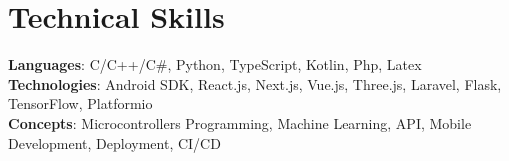 \section{Technical Skills}
    \begin{itemize}[leftmargin=0.15in, label={}]
	\small{\item{
		\textbf{Languages}{: C/C++/C\#, Python, TypeScript, Kotlin, Php, Latex} \\
		\textbf{Technologies}{: Android SDK, React.js, Next.js, Vue.js, Three.js, Laravel, Flask, TensorFlow, Platformio} \\
		\textbf{Concepts}{: Microcontrollers Programming, Machine Learning, API, Mobile Development, Deployment, CI/CD}
	}}
    \end{itemize}